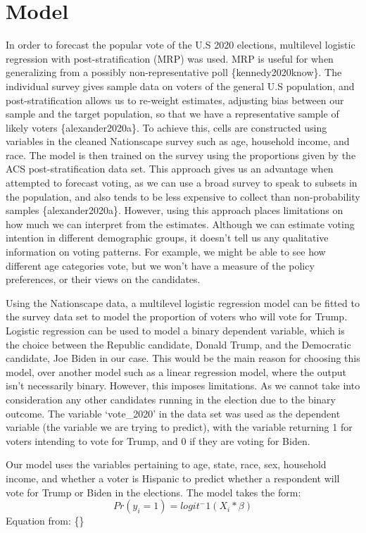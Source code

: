 \documentclass[
]{article}
\begin{document}
\hypertarget{model}{%
\section{Model}\label{model}}

In order to forecast the popular vote of the U.S 2020 elections, multilevel logistic regression with post-stratification (MRP) was used. MRP is useful for when generalizing from a possibly non-representative poll \{kennedy2020know\}. The individual survey gives sample data on voters of the general U.S population, and post-stratification allows us to re-weight estimates, adjusting bias between our sample and the target population, so that we have a representative sample of likely voters \{alexander2020a\}. To achieve this, cells are constructed using variables in the cleaned Nationscape survey such as age, household income, and race. The model is then trained on the survey using the proportions given by the ACS post-stratification data set. This approach gives us an advantage when attempted to forecast voting, as we can use a broad survey to speak to subsets in the population, and also tends to be less expensive to collect than non-probability samples \{alexander2020a\}. However, using this approach places limitations on how much we can interpret from the estimates. Although we can estimate voting intention in different demographic groups, it doesn't tell us any qualitative information on voting patterns. For example, we might be able to see how different age categories vote, but we won't have a measure of the policy preferences, or their views on the candidates.

Using the Nationscape data, a multilevel logistic regression model can be fitted to the survey data set to model the proportion of voters who will vote for Trump. Logistic regression can be used to model a binary dependent variable, which is the choice between the Republic candidate, Donald Trump, and the Democratic candidate, Joe Biden in our case. This would be the main reason for choosing this model, over another model such as a linear regression model, where the output isn't necessarily binary. However, this imposes limitations. As we cannot take into consideration any other candidates running in the election due to the binary outcome. The variable `vote\_2020' in the data set was used as the dependent variable (the variable we are trying to predict), with the variable returning 1 for voters intending to vote for Trump, and 0 if they are voting for Biden.

Our model uses the variables pertaining to age, state, race, sex, household income, and whether a voter is Hispanic to predict whether a respondent will vote for Trump or Biden in the elections.
The model takes the form:
\[ Pr(y_i = 1) = logit^-1(X_i *\beta) \]
Equation from: \{\citet{RAOS}\}
\end{document}
